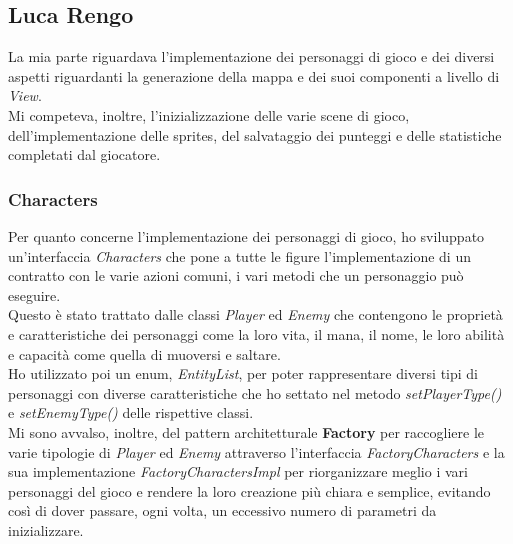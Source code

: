 \newpage

\subsection*{Luca Rengo}

\textsf{\small La mia parte riguardava l'implementazione dei personaggi di gioco e dei diversi aspetti riguardanti la generazione della mappa e dei suoi componenti a livello di \emph{View}.}\\

\textsf{\small Mi competeva, inoltre, l'inizializzazione delle varie scene di gioco, dell'implementazione delle sprites, del salvataggio dei punteggi e delle statistiche completati dal giocatore.}\\ 

\subsubsection*{Characters}

\textsf{\small Per quanto concerne l'implementazione dei personaggi di gioco, ho sviluppato un'interfaccia \emph{Characters} che pone a tutte le figure l'implementazione di un contratto con le varie azioni comuni, i vari metodi che un personaggio può eseguire.}\\

\textsf{\small Questo è stato trattato dalle classi \emph{Player} ed \emph{Enemy} che contengono le proprietà e caratteristiche dei personaggi come la loro vita, il mana, il nome, le loro abilità e capacità come quella di muoversi e saltare.}\\

\textsf{\small Ho utilizzato poi un enum, \emph{EntityList}, per poter rappresentare diversi tipi di personaggi con diverse caratteristiche che ho settato nel metodo \emph{setPlayerType()} e \emph{setEnemyType()} delle rispettive classi. }\\

\textsf{\small Mi sono avvalso, inoltre, del pattern architetturale \textbf{Factory} per raccogliere le varie tipologie di \emph{Player} ed \emph{Enemy} attraverso l'interfaccia \emph{FactoryCharacters} e la sua implementazione \emph{FactoryCharactersImpl} per riorganizzare meglio i vari personaggi del gioco e rendere la loro creazione più chiara e semplice, evitando così di dover passare, ogni volta, un eccessivo numero di parametri da inizializzare.}

